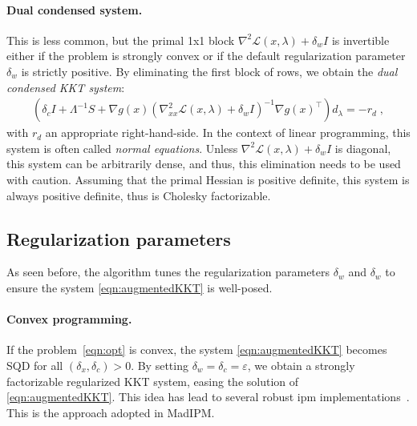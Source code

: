 \documentclass{article}
\begin{document}
\paragraph{Dual condensed system.}
This is less common, but the primal 1x1 block $\nabla^2 \mathcal{L}(x,\lambda) + \delta_w I$ is invertible either if the problem is strongly convex or if the default regularization parameter $\delta_w$ is strictly positive.
By eliminating the first block of rows, we obtain the \emph{dual condensed KKT system}:
\begin{align}\label{eqn:kkt_dual}
  \left(\delta_c I + \Lambda^{-1}S + \nabla g(x)\left(\nabla_{x x}^2 \mathcal{L}(x,\lambda) + \delta_w I\right)^{-1} \nabla g(x)^\top\right)
  d_\lambda = - r_d \; ,
\end{align}
with $r_d$ an appropriate right-hand-side.
In the context of linear programming, this system is often called \emph{normal equations}.
Unless $\nabla^2 \mathcal{L}(x,\lambda) + \delta_w I$ is diagonal, this system can be arbitrarily dense, and thus, this elimination needs to be used with caution. Assuming that the primal Hessian is positive definite, this system is always positive definite, thus is Cholesky factorizable.


\subsection{Regularization parameters}
As seen before, the algorithm tunes the regularization parameters $\delta_w$
and $\delta_w$ to ensure the system \eqref{eqn:augmentedKKT} is well-posed.

\paragraph{Convex programming.}

If the problem~\eqref{eqn:opt} is convex, the system \eqref{eqn:augmentedKKT}
becomes SQD for all $(\delta_x, \delta_c) > 0$. By setting
$\delta_w = \delta_c = \varepsilon$, we obtain a strongly factorizable regularized KKT system,
easing the solution of \eqref{eqn:augmentedKKT}.
This idea has lead to several robust \gls{ipm} implementations~\cite{}.
This is the approach adopted in MadIPM.
\end{document}
